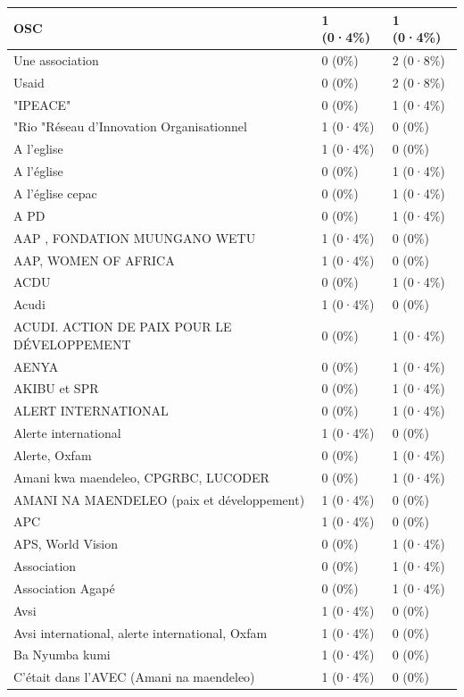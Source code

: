 \documentclass[
]{book}
\begin{document}
\begin{tabular}{l|l|l}
\hline
OSC & 1 (0·4\%) & 1 (0·4\%)\\
\hline
Une association & 0 (0\%) & 2 (0·8\%)\\
\hline
Usaid & 0 (0\%) & 2 (0·8\%)\\
\hline
"IPEACE" & 0 (0\%) & 1 (0·4\%)\\
\hline
"Rio "Réseau d'Innovation Organisationnel & 1 (0·4\%) & 0 (0\%)\\
\hline
A l'eglise & 1 (0·4\%) & 0 (0\%)\\
\hline
A l'église & 0 (0\%) & 1 (0·4\%)\\
\hline
A l'église cepac & 0 (0\%) & 1 (0·4\%)\\
\hline
A PD & 0 (0\%) & 1 (0·4\%)\\
\hline
AAP , FONDATION MUUNGANO WETU & 1 (0·4\%) & 0 (0\%)\\
\hline
AAP, WOMEN OF AFRICA & 1 (0·4\%) & 0 (0\%)\\
\hline
ACDU & 0 (0\%) & 1 (0·4\%)\\
\hline
Acudi & 1 (0·4\%) & 0 (0\%)\\
\hline
ACUDI.  ACTION DE PAIX POUR LE DÉVELOPPEMENT & 0 (0\%) & 1 (0·4\%)\\
\hline
AENYA & 0 (0\%) & 1 (0·4\%)\\
\hline
AKIBU et SPR & 0 (0\%) & 1 (0·4\%)\\
\hline
ALERT INTERNATIONAL & 0 (0\%) & 1 (0·4\%)\\
\hline
Alerte international & 1 (0·4\%) & 0 (0\%)\\
\hline
Alerte, Oxfam & 0 (0\%) & 1 (0·4\%)\\
\hline
Amani kwa maendeleo, CPGRBC, LUCODER & 0 (0\%) & 1 (0·4\%)\\
\hline
AMANI NA MAENDELEO (paix et développement) & 1 (0·4\%) & 0 (0\%)\\
\hline
APC & 1 (0·4\%) & 0 (0\%)\\
\hline
APS, World Vision & 0 (0\%) & 1 (0·4\%)\\
\hline
Association & 0 (0\%) & 1 (0·4\%)\\
\hline
Association Agapé & 0 (0\%) & 1 (0·4\%)\\
\hline
Avsi & 1 (0·4\%) & 0 (0\%)\\
\hline
Avsi international, alerte international, Oxfam & 1 (0·4\%) & 0 (0\%)\\
\hline
Ba Nyumba kumi & 1 (0·4\%) & 0 (0\%)\\
\hline
C'était dans l'AVEC (Amani na maendeleo) & 1 (0·4\%) & 0 (0\%)\\

\end{tabular}
\end{document}

